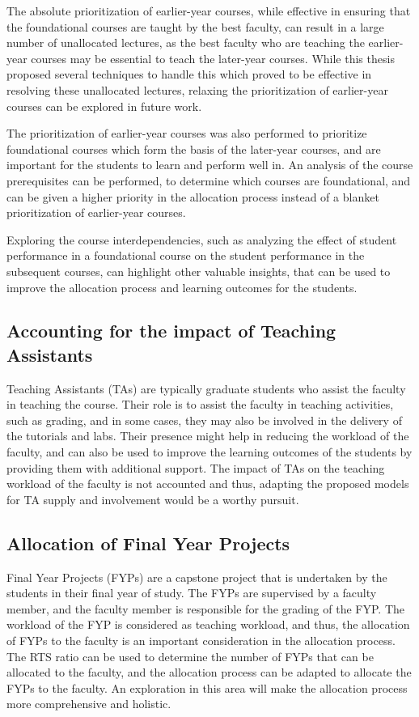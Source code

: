 The absolute prioritization of earlier-year courses, while effective in ensuring that the foundational courses are taught by the best faculty, can result in a large number of unallocated lectures, as the best faculty who are teaching the earlier-year courses may be essential to teach the later-year courses. While this thesis proposed several techniques to handle this which proved to be effective in resolving these unallocated lectures, relaxing the prioritization of earlier-year courses can be explored in future work.

The prioritization of earlier-year courses was also performed to prioritize foundational courses which form the basis of the later-year courses, and are important for the students to learn and perform well in. An analysis of the course prerequisites can be performed, to determine which courses are foundational, and can be given a higher priority in the allocation process instead of a blanket prioritization of earlier-year courses.

Exploring the course interdependencies, such as analyzing the effect of student performance in a foundational course on the student performance in the subsequent courses, can highlight other valuable insights, that can be used to improve the allocation process and learning outcomes for the students.

\subsection{Accounting for the impact of Teaching Assistants}

Teaching Assistants (TAs) are typically graduate students who assist the faculty in teaching the course. Their role is to assist the faculty in teaching activities, such as grading, and in some cases, they may also be involved in the delivery of the tutorials and labs. Their presence might help in reducing the workload of the faculty, and can also be used to improve the learning outcomes of the students by providing them with additional support. The impact of TAs on the teaching workload of the faculty is not accounted and thus, adapting the proposed models for TA supply and involvement would be a worthy pursuit.

\subsection{Allocation of Final Year Projects}

Final Year Projects (FYPs) are a capstone project that is undertaken by the students in their final year of study. The FYPs are supervised by a faculty member, and the faculty member is responsible for the grading of the FYP. The workload of the FYP is considered as teaching workload, and thus, the allocation of FYPs to the faculty is an important consideration in the allocation process. The RTS ratio can be used to determine the number of FYPs that can be allocated to the faculty, and the allocation process can be adapted to allocate the FYPs to the faculty. An exploration in this area will make the allocation process more comprehensive and holistic.

